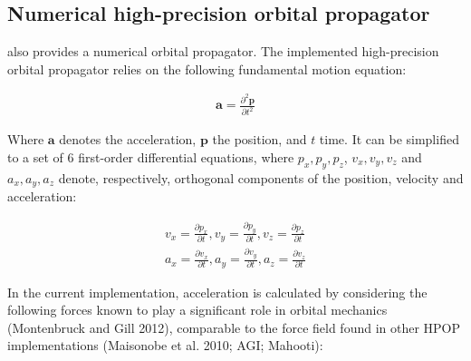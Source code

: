\hypertarget{numerical-high-precision-orbital-propagator}{%
\subsection{Numerical high-precision orbital propagator}\label{numerical-high-precision-orbital-propagator}}

 also provides a numerical orbital propagator. The implemented high-precision orbital propagator relies on the following fundamental motion equation:

\[
\begin{aligned}
    \mathbf{a} = \frac{\partial^2 \mathbf{p}}{\partial t^2}
\end{aligned}
\]

Where \(\mathbf{a}\) denotes the acceleration, \(\mathbf{p}\) the position, and \(t\) time. It can be simplified to a set of 6 first-order differential equations, where \(p_x, p_y, p_z\), \(v_x, v_y, v_z\) and \(a_x, a_y, a_z\) denote, respectively, orthogonal components of the position, velocity and acceleration:

\[
\begin{aligned}
v_x = \frac{\partial p_x}{\partial t}, v_y = \frac{\partial p_y}{\partial t}, v_z = \frac{\partial p_z}{\partial t} \\
a_x = \frac{\partial v_x}{\partial t}, a_y = \frac{\partial v_y}{\partial t}, a_z = \frac{\partial v_z}{\partial t}
\end{aligned}
\]

In the current implementation, acceleration is calculated by considering the following forces known to play a significant role in orbital mechanics (Montenbruck and Gill 2012), comparable to the force field found in other HPOP implementations (Maisonobe et al. 2010; AGI; Mahooti):

